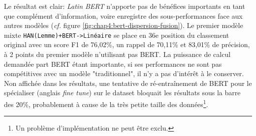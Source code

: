 Le résultat est clair: \textit{Latin BERT} n'apporte pas de bénéfices importants en tant que complément d'information, voire enregistre des sous-performances face aux autres modèles (\textit{cf.} figure \ref{fig:chap4:bert-dispersion-fusion}). Le premier modèle mixte \texttt{HAN(Lemme)+BERT->Linéaire} se place en 36e position du classement original avec un score F1 de 76,02\%, un rappel de 70,11\% et 83,01\% de précision, à 2 points du premier modèle n'utilisant pas BERT. La puissance de calcul demandée part BERT étant importante, si ses performances ne sont pas compétitives avec un modèle "traditionnel", il n'y a pas d'intérêt à le conserver. Non affichée dans les résultats, une tentative de ré-entraînement de BERT pour le spécialiser (anglais \textit{fine tune}) sur le dataset bloquait les résultats sous la barre des 20\%, probablement à cause de la très petite taille des données\footnote{Un problème d'implémentation ne peut être exclu.}.

